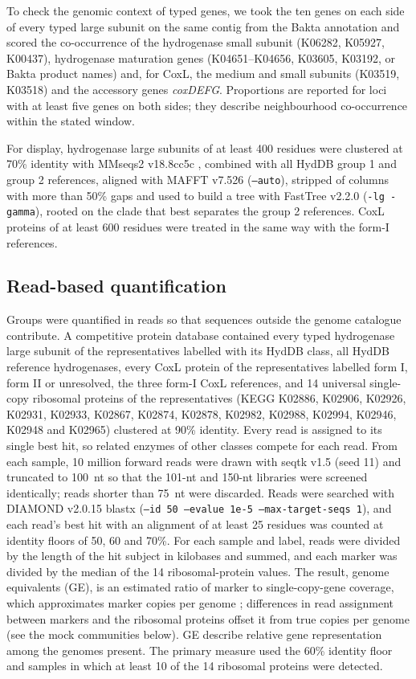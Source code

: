 \documentclass[11pt]{article}
\begin{document}
To check the genomic context of typed genes, we took the ten genes on each side of every typed large
subunit on the same contig from the Bakta annotation and scored the co-occurrence of the hydrogenase
small subunit (K06282, K05927, K00437), hydrogenase maturation genes (K04651--K04656, K03605, K03192, or
Bakta product names) and, for CoxL, the medium and small subunits (K03519, K03518) and the accessory genes
\textit{coxDEFG}. Proportions are reported for loci with at least five genes on both sides; they describe
neighbourhood co-occurrence within the stated window.

For display, hydrogenase large subunits of at least 400 residues were clustered at 70\% identity with
MMseqs2 v18.8cc5c \citep{steinegger2017mmseqs2}, combined with all HydDB group 1 and group 2 references,
aligned with MAFFT v7.526 \citep{katoh2013mafft} (\texttt{--auto}), stripped of columns with more than 50\%
gaps and used to build a tree with FastTree v2.2.0 \citep{price2010fasttree} (\texttt{-lg -gamma}), rooted
on the clade that best separates the group 2 references. CoxL proteins of at least 600 residues were
treated in the same way with the form-I references.

\subsection*{Read-based quantification}
Groups were quantified in reads so that sequences outside the genome catalogue contribute. A competitive
protein database contained every typed hydrogenase large subunit of the representatives labelled with its
HydDB class, all HydDB reference hydrogenases, every CoxL protein of the representatives labelled form I,
form II or unresolved, the three form-I CoxL references, and 14 universal single-copy ribosomal proteins of
the representatives (KEGG K02886, K02906, K02926, K02931, K02933, K02867, K02874, K02878, K02982, K02988,
K02994, K02946, K02948 and K02965) clustered at 90\% identity. Every read is assigned to its single best
hit, so related enzymes of other classes compete for each read. From each sample, 10 million forward reads
were drawn with seqtk v1.5 \citep{li2023seqtk} (seed 11) and truncated to 100~nt so that the 101-nt and
150-nt libraries were screened identically; reads shorter than 75~nt were discarded. Reads were searched
with DIAMOND v2.0.15 \citep{buchfink2021diamond} blastx (\texttt{--id 50 --evalue 1e-5 --max-target-seqs
1}), and each read's best hit with an alignment of at least 25 residues was counted at identity floors of
50, 60 and 70\%. For each sample and label, reads were divided by the length of the hit subject in
kilobases and summed, and each marker was divided by the median of the 14 ribosomal-protein values. The
result, genome equivalents (GE), is an estimated ratio of marker to single-copy-gene coverage, which
approximates marker copies per genome \citep{nayfach2015microbecensus}; differences in read assignment
between markers and the ribosomal proteins offset it from true copies per genome (see the mock communities
below). GE describe relative gene representation among the genomes present. The primary
measure used the 60\% identity floor and samples in which at least 10 of the 14 ribosomal proteins were
detected.
\end{document}

